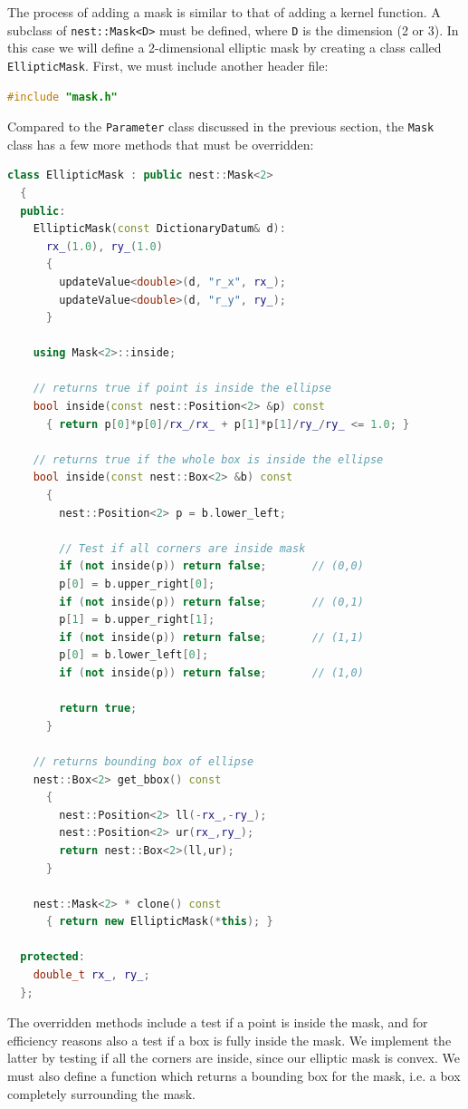 \documentclass[a4paper,12pt]{report}
\begin{document}
The process of adding a mask is similar to that of adding a kernel
function. A subclass of \lstinline!nest::Mask<D>! must be defined, where
\lstinline!D! is the dimension (2 or 3). In this case we will define a
2-dimensional elliptic mask by creating a class called
\lstinline!EllipticMask!. First, we must include another header file:
\begin{lstlisting}[language=C++]
#include "mask.h"
\end{lstlisting}
Compared to the \lstinline!Parameter! class discussed in the previous
section, the \lstinline!Mask! class has a few more methods that must be
overridden:
\begin{lstlisting}[language=C++]
  class EllipticMask : public nest::Mask<2>
  {
  public:
    EllipticMask(const DictionaryDatum& d):
      rx_(1.0), ry_(1.0)
      {
        updateValue<double>(d, "r_x", rx_);
        updateValue<double>(d, "r_y", ry_);
      }

    using Mask<2>::inside;

    // returns true if point is inside the ellipse
    bool inside(const nest::Position<2> &p) const
      { return p[0]*p[0]/rx_/rx_ + p[1]*p[1]/ry_/ry_ <= 1.0; }

    // returns true if the whole box is inside the ellipse
    bool inside(const nest::Box<2> &b) const
      {
        nest::Position<2> p = b.lower_left;

        // Test if all corners are inside mask
        if (not inside(p)) return false;       // (0,0)
        p[0] = b.upper_right[0];
        if (not inside(p)) return false;       // (0,1)
        p[1] = b.upper_right[1];
        if (not inside(p)) return false;       // (1,1)
        p[0] = b.lower_left[0];
        if (not inside(p)) return false;       // (1,0)

        return true;
      }

    // returns bounding box of ellipse
    nest::Box<2> get_bbox() const
      {
        nest::Position<2> ll(-rx_,-ry_);
        nest::Position<2> ur(rx_,ry_);
        return nest::Box<2>(ll,ur);
      }

    nest::Mask<2> * clone() const
      { return new EllipticMask(*this); }

  protected:
    double_t rx_, ry_;
  };
\end{lstlisting}
The overridden methods include a test if a point is inside the mask, and
for efficiency reasons also a test if a box is fully inside the mask. We
implement the latter by testing if all the corners are inside, since our
elliptic mask is convex. We must also define a function which returns a
bounding box for the mask, i.e. a box completely surrounding the mask.
\end{document}

